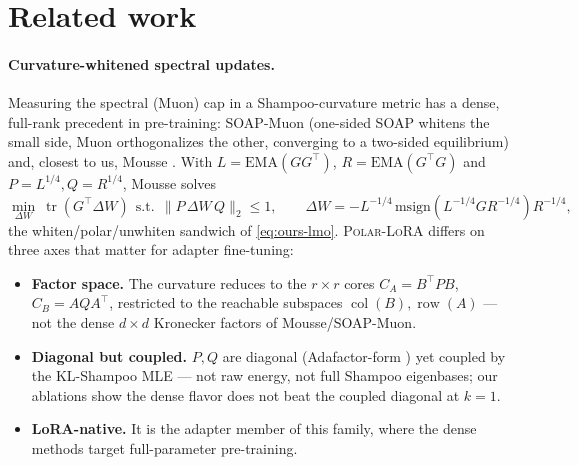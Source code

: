 \documentclass[11pt]{article}
\newcommand{\methodname}{\textsc{Polar-LoRA}\xspace}
\theoremstyle{plain}
\theoremstyle{definition}
\theoremstyle{remark}
\begin{document}
\section{Related work}
\label{sec:related}

\paragraph{Curvature-whitened spectral updates.} Measuring the spectral (Muon) cap in a Shampoo-curvature metric has a dense, full-rank precedent in pre-training: SOAP-Muon \cite{soapmuon} (one-sided SOAP whitens the small side, Muon orthogonalizes the other, converging to a two-sided equilibrium) and, closest to us, Mousse \cite{mousse}. With $L=\mathrm{EMA}(GG^\top)$, $R=\mathrm{EMA}(G^\top G)$ and $P=L^{1/4},Q=R^{1/4}$, Mousse solves
\begin{equation*}
  \min_{\Delta W}\ \operatorname{tr}(G^\top\Delta W)\ \ \text{s.t.}\ \ \|P\,\Delta W\,Q\|_2\le1,
  \qquad
  \Delta W=-L^{-1/4}\,\mathrm{msign}(L^{-1/4}GR^{-1/4})R^{-1/4},
\end{equation*}
the whiten/polar/unwhiten sandwich of \eqref{eq:ours-lmo}. \methodname{} differs on three axes that matter for adapter fine-tuning:
\begin{itemize}[leftmargin=1.5em,itemsep=1pt,topsep=2pt]
  \item \textbf{Factor space.} The curvature reduces to the $r\times r$ cores $C_A=B^\top PB$, $C_B=AQA^\top$, restricted to the reachable subspaces $\operatorname{col}(B),\operatorname{row}(A)$ --- not the dense $d\times d$ Kronecker factors of Mousse/SOAP-Muon.
  \item \textbf{Diagonal but coupled.} $P,Q$ are diagonal (Adafactor-form \cite{adafactor}) yet coupled by the KL-Shampoo MLE \cite{klshampoo} --- not raw energy, not full Shampoo eigenbases; our ablations show the dense flavor does not beat the coupled diagonal at $k{=}1$.
  \item \textbf{LoRA-native.} It is the adapter member of this family, where the dense methods target full-parameter pre-training.
\end{itemize}
\end{document}

